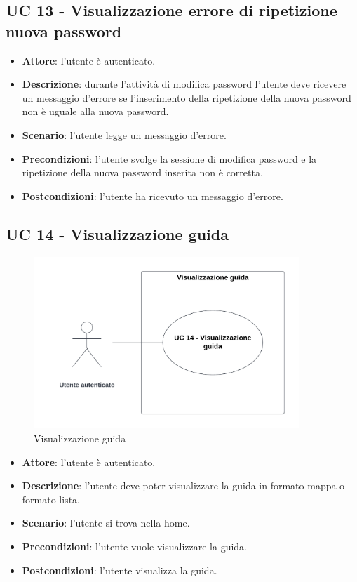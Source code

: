 \subsection{UC 13 - Visualizzazione errore di ripetizione nuova password}
\begin{itemize}
    \item \textbf{Attore}: l'utente è autenticato.
    \item \textbf{Descrizione}: durante l'attività di modifica password l'utente deve ricevere un messaggio d'errore se l'inserimento della ripetizione della nuova password non è uguale alla nuova password.
    \item \textbf{Scenario}: l'utente legge un messaggio d'errore. 
    \item \textbf{Precondizioni}: l'utente svolge la sessione di modifica password e la ripetizione della nuova password inserita non è corretta.
    \item \textbf{Postcondizioni}: l'utente ha ricevuto un messaggio d'errore.
\end{itemize}

\subsection{UC 14 - Visualizzazione guida}

\begin{figure}[!h]
    \includegraphics[width=10cm]{sezioni/Images/UC14.png}
    \centering
    \caption{Visualizzazione guida}
\end{figure}

\begin{itemize}
    \item \textbf{Attore}: l'utente è autenticato.
    \item \textbf{Descrizione}: l'utente deve poter visualizzare la guida in formato mappa o formato lista.
    \item \textbf{Scenario}: l'utente si trova nella home.
    \item \textbf{Precondizioni}: l'utente vuole visualizzare la guida.
    \item \textbf{Postcondizioni}: l'utente visualizza la guida.
\end{itemize}

